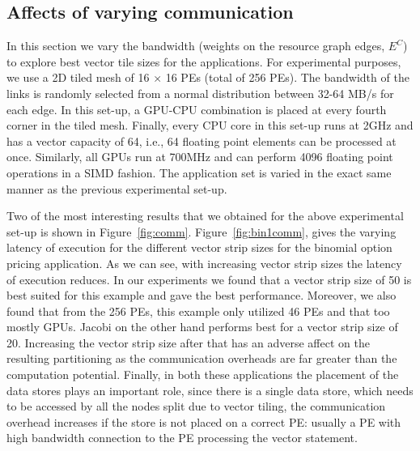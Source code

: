 
\subsection{Affects of varying communication}
\label{sec:arch-expl-with}


In this section we vary the bandwidth (weights on the resource graph
edges, $E^C$) to explore best vector tile sizes for the applications.
For experimental purposes, we use a 2D tiled mesh of 16 $\times$ 16 PEs
(total of 256 PEs). The bandwidth of the links is randomly selected from
a normal distribution between 32-64 MB/s for each edge. In this set-up,
a GPU-CPU combination is placed at every fourth corner in the tiled
mesh. Finally, every CPU core in this set-up runs at 2GHz and has a
vector capacity of 64, i.e., 64 floating point elements can be processed
at once. Similarly, all GPUs run at 700MHz and can perform 4096 floating
point operations in a SIMD fashion. The application set is varied in the
exact same manner as the previous experimental set-up.


Two of the most interesting results that we obtained for the above
experimental set-up is shown in
Figure~\ref{fig:comm}. Figure~\ref{fig:bin1comm}, gives the varying
latency of execution for the different vector strip sizes for the
binomial option pricing application. As we can see, with increasing
vector strip sizes the latency of execution reduces. In our experiments
we found that a vector strip size of 50 is best suited for this example
and gave the best performance. Moreover, we also found that from the 256
PEs, this example only utilized 46 PEs and that too mostly GPUs.  Jacobi
on the other hand performs best for a vector strip size of
20. Increasing the vector strip size after that has an adverse affect on
the resulting partitioning as the communication overheads are far
greater than the computation potential. Finally, in both these
applications the placement of the data stores plays an important role,
since there is a single data store, which needs to be accessed by all
the nodes split due to vector tiling, the communication overhead
increases if the store is not placed on a correct PE: usually a PE with
high bandwidth connection to the PE processing the vector statement.

